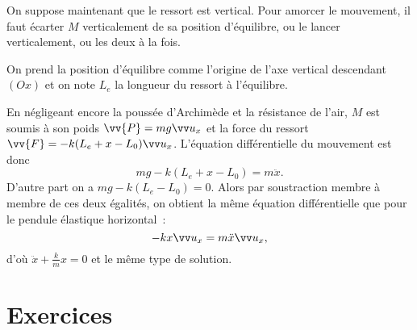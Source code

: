 On suppose maintenant que le ressort est vertical. Pour amorcer le mouvement, il faut écarter $M$ verticalement de sa position d'équilibre, ou le lancer verticalement, ou les deux à la fois.

On prend la position d'équilibre comme l'origine de l'axe vertical descendant $(Ox)$ et on note $L_e$ la longueur du ressort à l'équilibre.

En négligeant encore la poussée d'Archimède et la résistance de l'air, $M$ est soumis à son poids $\vv{P}=mg\ux$ et la force du ressort $\vv{F}=-k(L_e +x-L_0)\ux$. 
L'équation différentielle du mouvement est donc
\begin{equation}
  mg -k(L_e +x-L_0) = m\ddot{x}.
\end{equation}
D'autre part on a $ mg -k(L_e-L_0)=0$. Alors par soustraction membre à membre de ces deux égalités, on obtient la même équation différentielle que pour le pendule élastique horizontal~:
\begin{equation}
  -kx \ux = m \ddot{x} \ux,
\end{equation}
d'où $\ddot{x} +\frac{k}{m}x=0$ et le même type de solution.

\section{Exercices}
\label{chap3-sec:exercices}

